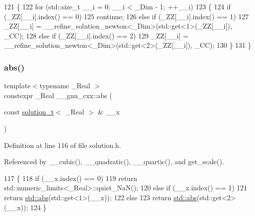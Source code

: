 \begin{DoxyCode}
121     \{
122       \textcolor{keywordflow}{for} (std::size\_t \_\_i = 0; \_\_i < \_Dim - 1; ++\_\_i)
123         \{
124           \textcolor{keywordflow}{if} (\_ZZ[\_\_i].index() == 0)
125             \textcolor{keywordflow}{continue};
126           \textcolor{keywordflow}{else} \textcolor{keywordflow}{if} (\_ZZ[\_\_i].index() == 1)
127             \_ZZ[\_\_i] = \_\_refine\_solution\_newton<\_Dim>(std::get<1>(\_ZZ[\_\_i]), \_CC);
128           \textcolor{keywordflow}{else} \textcolor{keywordflow}{if} (\_ZZ[\_\_i].index() == 2)
129             \_ZZ[\_\_i] = \_\_refine\_solution\_newton<\_Dim>(std::get<2>(\_ZZ[\_\_i]), \_CC);
130         \}
131     \}
\end{DoxyCode}
\mbox{\label{namespace____gnu__cxx_ab9eb9db3560f504f8cd25a71bcb6ead5}} 
\subsubsection{\texorpdfstring{abs()}{abs()}}
{\footnotesize\ttfamily template$<$typename \+\_\+\+Real $>$ \\
constexpr \+\_\+\+Real \+\_\+\+\_\+gnu\+\_\+cxx\+::abs (\begin{DoxyParamCaption}\item[{const \hyperlink{namespace____gnu__cxx_ae20ea642de50eb361074c62676b0159c}{solution\+\_\+t}$<$ \+\_\+\+Real $>$ \&}]{\+\_\+\+\_\+x }\end{DoxyParamCaption})}



Definition at line 116 of file solution.\+h.



Referenced by \+\_\+\+\_\+cubic(), \+\_\+\+\_\+quadratic(), \+\_\+\+\_\+quartic(), and get\+\_\+scale().


\begin{DoxyCode}
117     \{
118       \textcolor{keywordflow}{if} (\_\_x.index() == 0)
119         \textcolor{keywordflow}{return} std::numeric\_limits<\_Real>::quiet\_NaN();
120       \textcolor{keywordflow}{else} \textcolor{keywordflow}{if} (\_\_x.index() == 1)
121         \textcolor{keywordflow}{return} \hyperlink{namespace____gnu__cxx_ab9eb9db3560f504f8cd25a71bcb6ead5}{std::abs}(std::get<1>(\_\_x));
122       \textcolor{keywordflow}{else}
123         \textcolor{keywordflow}{return} \hyperlink{namespace____gnu__cxx_ab9eb9db3560f504f8cd25a71bcb6ead5}{std::abs}(std::get<2>(\_\_x));
124     \}
\end{DoxyCode}
\mbox{\label{namespace____gnu__cxx_abe506cf34c921c378a681f0de31d49a5}} 
